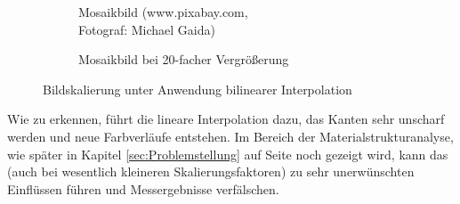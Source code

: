 \documentclass[
fontsize=10pt, 
listof = totoc,
parskip = half	
]{report}
\begin{document}
\begin{figure}[H]
	\begin{subfigure}[t]{0.49\textwidth}
		\centering
		\caption{Mosaikbild (www.pixabay.com,\\ Fotograf: Michael Gaida)}
	\end{subfigure}\hfill
	\begin{subfigure}[t]{0.49\textwidth}
		\centering
		\caption{Mosaikbild bei 20-facher Vergrößerung}
	\end{subfigure}
	\caption{Bildskalierung unter Anwendung bilinearer Interpolation}
	\label{fig:MosaicBilinear}
\end{figure}
\noindent Wie zu erkennen, führt die lineare Interpolation dazu, das Kanten sehr unscharf werden und neue Farbverläufe entstehen. Im Bereich der Materialstrukturanalyse, wie später in Kapitel \ref{sec:Problemstellung} auf Seite \pageref{sec:Problemstellung} noch gezeigt wird, kann das (auch bei wesentlich kleineren Skalierungsfaktoren) zu sehr unerwünschten Einflüssen führen und Messergebnisse verfälschen.
\end{document}
